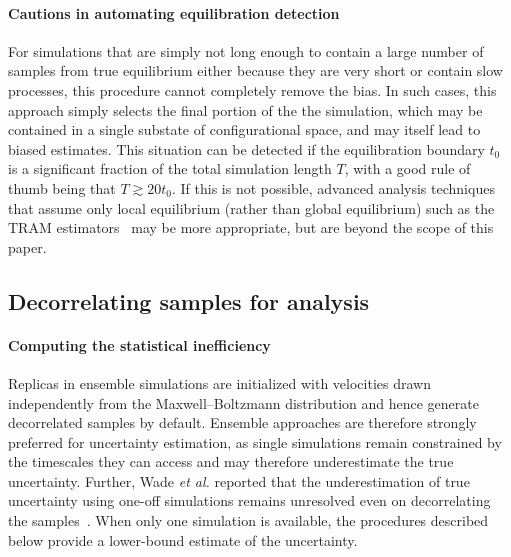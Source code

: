 \documentclass[9pt,bestpractices]{livecoms}
\begin{document}
\paragraph{Cautions in automating equilibration detection}
For simulations that are simply not long enough to contain a large number of samples from true equilibrium either because they are very short or contain slow processes, this procedure cannot completely remove the bias.
In such cases, this approach simply selects the final portion of the the simulation, which may be contained in a single substate of configurational space, and may itself lead to biased estimates. 
This situation can be detected if the equilibration boundary $t_0$ is a significant fraction of the total simulation length $T$, with a good rule of thumb being that $T \gtrsim 20 t_0$.
If this is not possible, advanced analysis techniques that assume only local equilibrium (rather than global equilibrium) such as the TRAM estimators~\cite{mey2014xtram,wu2016multiensemble,nuske2017markov} may be more appropriate, but are beyond the scope of this paper.


\subsection{Decorrelating samples for analysis}
\label{sec:decorrelating-samples}
\paragraph{Computing the statistical inefficiency}
Replicas in ensemble simulations are initialized with velocities drawn independently from the Maxwell–Boltzmann distribution and hence generate decorrelated samples by default. Ensemble approaches are therefore strongly preferred for uncertainty estimation, as single simulations remain constrained by the timescales they can access and may therefore underestimate the true uncertainty. Further, Wade \textit{et al.} reported that the underestimation of true uncertainty using one-off simulations remains unresolved even on decorrelating the samples~\cite{wade2022}. When only one simulation is available, the procedures described below provide a lower-bound estimate of the uncertainty.
\end{document}
